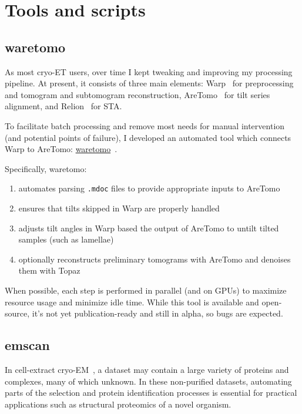 \section{Tools and scripts}

\subsection{waretomo}\label{waretomo}

As most cryo-ET users, over time I kept tweaking and improving my processing pipeline.
At present, it consists of three main elements: Warp~\cite{tegunovRealtimeCryoelectronMicroscopy2019} for preprocessing and tomogram and subtomogram reconstruction, AreTomo~\cite{zhengAreTomoIntegratedSoftware2022} for tilt series alignment, and Relion~\cite{scheresRELIONImplementationBayesian2012,zivanovBayesianApproachSingleparticle2022,burtImageProcessingPipeline2024} for STA.

To facilitate batch processing and remove most needs for manual intervention (and potential points of failure), I developed an automated tool which connects Warp to AreTomo: \href{https://gihub.com/brisvag/waretomo}{waretomo}~\cite{gaifasWaretomo2024}.

Specifically, waretomo:
\begin{enumerate}[noitemsep]
    \item automates parsing \texttt{.mdoc} files to provide appropriate inputs to AreTomo
    \item ensures that tilts skipped in Warp are properly handled
    \item adjusts tilt angles in Warp based the output of AreTomo to untilt tilted samples (such as lamellae)
    \item optionally reconstructs preliminary tomograms with AreTomo and denoises them with Topaz~\cite{beplerTopazDenoiseGeneralDeep2020}
\end{enumerate}

When possible, each step is performed in parallel (and on GPUs) to maximize resource usage and minimize idle time.
While this tool is available and open-source, it's not yet publication-ready and still in alpha, so bugs are expected.

\subsection{emscan}\label{emscan}

In cell-extract cryo-EM~\cite{suBuildRetrieveMethodology2021,kyrilisIntegrativeBiologyNative2019}, a dataset may contain a large variety of proteins and complexes, many of which unknown.
In these non-purified datasets, automating parts of the selection and protein identification processes is essential for practical applications such as structural proteomics of a novel organism.

